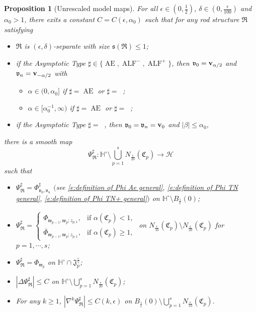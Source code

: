 \documentclass[a4paper,11pt]{amsart}
\newtheorem{proposition}[theorem]{Proposition}
\theoremstyle{definition}
\numberwithin{equation}{section}
\newcommand{\mv} {\mathfrak v}
\newcommand{\mw} {\mathfrak w}
\newcommand{\ms} {\mathfrak s}
\newcommand{\mJ} {\mathfrak J}
\newcommand{\mR} {\mathfrak R}
\newcommand{\mC} {\mathfrak C}
\DeclareMathOperator{\bv}{{\bf v}}
\DeclareMathOperator{\Ae}{AE}
\DeclareMathOperator{\ALF}{ALF}
\DeclareMathOperator{\ALFp}{ALF^+}
\DeclareMathOperator{\ALFm}{ALF^{--}}
\DeclareMathOperator{\AFa}{AF_\beta}
\begin{document}
\begin{proposition}[Unrescaled model maps] \label{p:background map}
	For all $\epsilon \in(0, \frac{1}{2})$, $\delta\in (0, \frac{\epsilon}{100})$ and $\alpha_0>1$,  there exits a constant $C=C(\epsilon, \alpha_0)$ such that for any rod structure $\mR$  satisfying 
    \begin{itemize}
        \item $\mR$ is $(\epsilon, \delta)$-separate with size $\ms(\mR)\leq 1$;
        \item if the Asymptotic Type $\sharp\in \{\Ae, \ALF^{-}, \ALF^+\}$, then $\mv_0=\bv_{\alpha/2}$ and $\mv_n=\bv_{-\alpha/2}$ with
        \begin{itemize}
            \item  $\alpha\in (0, \alpha_0]$ if $\sharp=\Ae$ or $\sharp=\ALFm$;
            \item $\alpha\in [\alpha_0^{-1}, \infty)$ if $\sharp=\Ae$ or $\sharp=\ALFp$;        \end{itemize}
        
       
        \item if the Asymptotic Type $\sharp=\AFa$, then $\mv_0=\mv_n=\bv_0$ and $|\beta|\leq \alpha_0$,
    \end{itemize}
    there is a smooth map
	$$\Psi_{\mR}^\sharp: \mathbb H^\circ\setminus \bigcup_{p=1}^sN_{\frac{\epsilon}{20}}(\mC_p)\rightarrow \mathcal H$$
	such that 
	\begin{itemize}
		\item $\Psi_{\mR}^\sharp=\Phi^\sharp_{\mv_0, \mv_n}$ $($see \eqref{e:definition of Phi Ae general}, \eqref{e:definition of Phi TN general}, \eqref{e:definition of Phi TN+ general}$)$ on $\mathbb H^\circ\setminus B_{\frac{1}{\epsilon}}(0)$;
		\item $\Psi_{\mR}^\sharp=\begin{cases}
		    \Phi_{\mw_{p-1}, \mw_{p}; z_{p,1}},&\text{if }\alpha(\mC_{p})<1,\\
            \overline{\Phi}_{\mw_{p-1}, \mw_{p}; z_{p,1}},&\text{if }\alpha(\mC_{p})\geq1,
		\end{cases}$ on $N_{\frac{\epsilon}{10}}(\mC_p)\setminus N_{\frac{\epsilon}{20}}(\mC_p)$ for $p=1, \cdots, s$;
		\item  $\Psi_{\mR}^\sharp=\Phi_{\mw_p}$ on $\mathbb H^\circ\cap  \mJ_p^{\frac{\epsilon}{5}}$;
		\item  $|\Delta\Psi_{\mR}^\sharp|\leq C$ on $\mathbb H^\circ\setminus \bigcup_{p=1}^sN_{\frac{\epsilon}{20}}(\mC_p)$;
        \item For any $k\geq 1$, $|\nabla^k\Psi_{\mR}^\sharp|\leq C(k, \epsilon)$ on $B_{\frac{1}{\epsilon}}(0)\setminus \bigcup_{p=1}^sN_{\frac{\epsilon}{10}}(\mC_p)$.
	\end{itemize}
\end{proposition}
\end{document}
